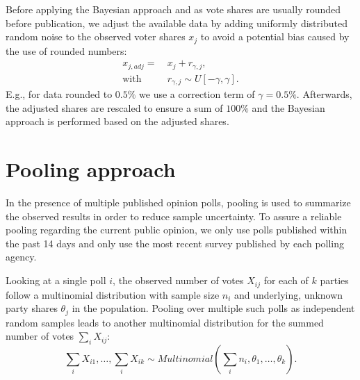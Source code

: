 \documentclass[smallcondensed]{svjour3}     %
\begin{document}
Before applying the Bayesian approach and as vote shares are usually rounded
before publication, we adjust the available data by adding uniformly distributed
random noise to the
observed voter shares $x_j$ to avoid a potential bias caused by the use of
rounded numbers:
\begin{equation}
\begin{aligned}
x_{j,adj} = \ &x_j + r_{\gamma,j}, \\
\text{with} \ \ \ \ \ &r_{\gamma,j} \sim U[-\gamma,\gamma].
\end{aligned}
\end{equation}
E.g., for data rounded to $0.5\%$ we use a correction term of $\gamma = 0.5\%$. Afterwards, the adjusted shares are rescaled to ensure a sum of $100\%$ and the Bayesian approach is performed based on the adjusted shares.


\section{Pooling approach} \label{sec:pooling}
In the presence of multiple published opinion polls, pooling is used to
summarize the observed results in order to reduce sample uncertainty.
To assure a reliable pooling regarding the current public opinion,
we only use polls published within the past 14 days and only use the
most recent survey published by each polling agency.

Looking at a single poll $i$, the observed number of votes $X_{ij}$ for each of $k$ parties follow a multinomial distribution with sample size $n_i$ and underlying, unknown party shares $\theta_j$ in the population.
Pooling over multiple such polls as independent random samples leads to another multinomial distribution for the summed number of votes $\sum_i X_{ij}$:
\begin{equation}
\sum\limits_i X_{i1},\ldots, \sum\limits_i X_{ik} \sim Multinomial \left( \sum\limits_i n_i,\theta_1,\ldots,\theta_k \right).
\end{equation}
\end{document}

